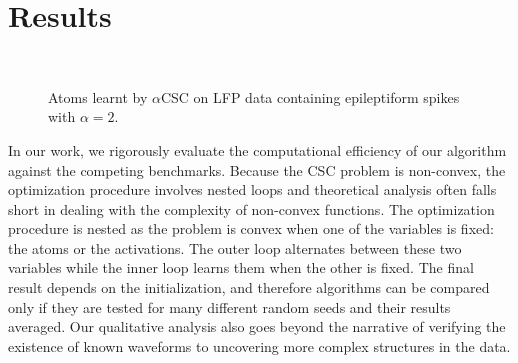 \section*{Results}
\begin{figure}[htb]
    \centering
              \\

            \caption[]{Atoms learnt by $\alpha$CSC on LFP data containing epileptiform spikes with $\alpha=2$.}
            \label{fig:sommaire:spikedata}
\end{figure}

In our work, we rigorously evaluate the computational efficiency of our algorithm against the competing benchmarks. Because the \ac{CSC} problem is non-convex, the optimization procedure involves nested loops and theoretical analysis often falls short in dealing with the complexity of non-convex functions. 
The optimization procedure is nested as the problem is convex when one of the variables is fixed: the atoms or the activations. The outer loop alternates between these two variables while the inner loop learns them when the other is fixed. The final result depends on the initialization, and therefore algorithms can be compared only if they are tested for many different random seeds and their results averaged. Our qualitative analysis also goes beyond the narrative of verifying the existence of known waveforms to uncovering more complex structures in the data.

